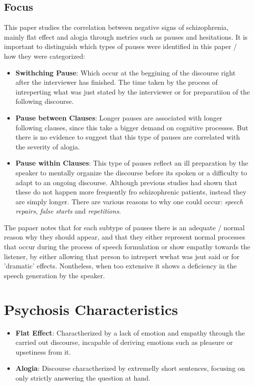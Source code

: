 \documentclass{Paper_Summary}
\begin{document}
\makepapertitle

\breakline

\begin{center}
    \section*{Focus}
\end{center}
    
This paper studies the correlation between negative signs of schizophrenia, mainly flat effect and alogia through metrics such as pauses and hesitations.
It is important to distinguish which types of pauses were identified in this paper / how they were categorized:
\begin{itemize}
    \item \textbf{Swithching Pause}: Which occur at the beggining of the discourse right after the interviewer has finished. The time taken by the process of intreperting what was just stated by the interviewer or for preparatiion of the following discourse.
    \item \textbf{Pause between Clauses}: Longer pauses are associated with longer following clauses, since this take a bigger demand on cognitive processes. But there is no evidence to suggest that this type of pauses are correlated with the severity of alogia.
    \item \textbf{Pause within Clauses}: This type of pauses reflect an ill preparation by the speaker to mentally organize the discourse before its spoken or a difficulty to adapt to an ongoing discourse. Although previous studies had shown that these do not happen more frequently fro schizophrenic patients, instead they are simply longer. There are various reasons to why one could occur: \emph{speech repairs}, \emph{false starts} and \emph{repetitions}.
\end{itemize}

The papaer notes that for each subtype of pauses there is an adequate / normal reason why they should appear, and that they either represent normal processes that occur during the process of speech formulation or show empathy towards the listener, by either allowing that person to intrepert wwhat was jsut said or for 'dramatic' effects. Nontheless, when too extensive it shows a deficiency in the speech generation by the speaker.

\breakline

\newpage

\section{Psychosis Characteristics}
    \begin{itemize}
        \item \textbf{Flat Effect}: Charactherized by a lack of emotion and empathy through the carried out discourse, incapable of deriving emotions such as pleasure or upsetiness from it.
        \item \textbf{Alogia}: Discourse charactherized by extremelly short sentences, focusing on only strictly answering the question at hand.
    \end{itemize}
\end{document}
